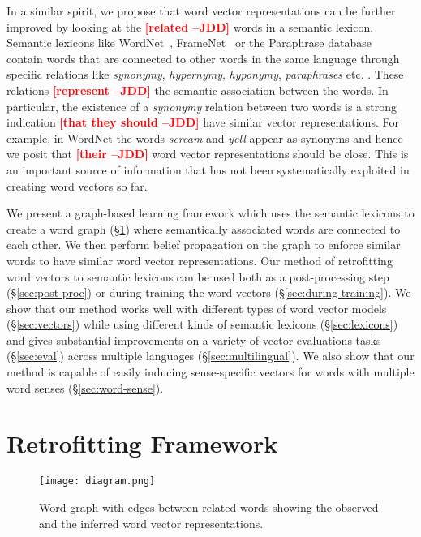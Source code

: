 \documentclass[11pt]{article}
\newcommand{\jdd}[1]{\textcolor{red}{\bf\small [#1 --JDD]}}
\begin{document}
In a similar spirit, we propose that
word vector representations can be further improved by looking at the \jdd{related}  words
in a semantic lexicon. Semantic lexicons like  WordNet~\cite{miller:1995}, 
FrameNet~\cite{Baker:1998:BFP:980845.980860} or the Paraphrase 
database~\cite{ganitkevitch2013ppdb} contain words that are connected to other words in 
the same language through specific relations like \textit{synonymy}, \textit{hypernymy},
\textit{hyponymy}, \textit{paraphrases} etc. . These relations  \jdd{represent} the semantic
association between the words. In particular, the existence of a \textit{synonymy} relation 
between two words is a strong indication \jdd{that they should}  have similar vector representations.
For example, in WordNet the words \textit{scream} and \textit{yell} appear as synonyms
and hence we posit that \jdd{their}  word vector representations should be close. 
This is an important source of information that has not been 
systematically exploited in creating word vectors so far.

We present a graph-based learning framework which
uses the semantic lexicons to create a word graph (\S\ref{sec:framework}) 
where semantically associated words
are connected to each other. We then perform belief propagation on the graph to enforce
similar words to have similar word vector representations. Our method of 
retrofitting%
word vectors to semantic lexicons can be used both as a 
post-processing step (\S\ref{sec:post-proc}) or during training the word 
vectors (\S\ref{sec:during-training}). 
We show that our method works well with
different types of word vector models (\S\ref{sec:vectors}) 
while using different kinds of semantic lexicons (\S\ref{sec:lexicons}) 
and gives substantial improvements on a variety of vector evaluations tasks (\S\ref{sec:eval}) 
across multiple languages (\S\ref{sec:multilingual}). We also show that our method
is capable of easily inducing sense-specific vectors for words with multiple
word senses (\S\ref{sec:word-sense}).

\section{Retrofitting Framework}
\label{sec:framework}

\begin{figure}[tb]
  \centering
  \texttt{[image: diagram.png]}
  \caption{Word graph with edges between related words showing the observed and the inferred word vector representations.}
  \label{fig:word-graph}
\end{figure}
\end{document}
